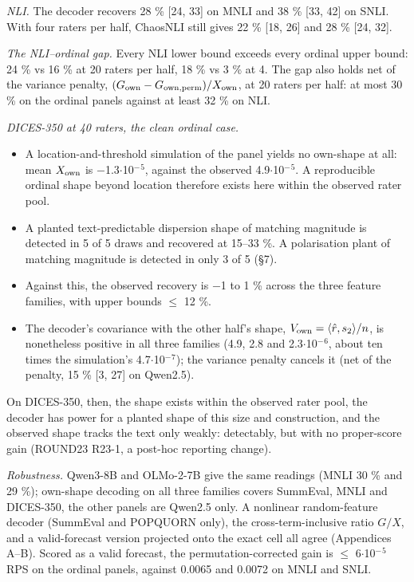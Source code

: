 \documentclass[10pt,twocolumn]{article}
\providecommand{\tightlist}{\setlength{\itemsep}{0pt}\setlength{\parskip}{0pt}}
\begin{document}
\emph{NLI.} The decoder recovers 28 \% {[}24, 33{]} on MNLI and 38 \% {[}33, 42{]} on SNLI. With four raters per half, ChaosNLI still gives 22 \% {[}18, 26{]} and 28 \% {[}24, 32{]}.

\emph{The NLI--ordinal gap.} Every NLI lower bound exceeds every ordinal upper bound: 24 \% vs 16 \% at 20 raters per half, 18 \% vs 3 \% at 4. The gap also holds net of the variance penalty, \((G_{\rm own}-G_{\rm own,perm})/X_{\rm own}\), at 20 raters per half: at most 30 \% on the ordinal panels against at least 32 \% on NLI.

\emph{DICES-350 at 40 raters, the clean ordinal case.}

\begin{itemize}
\tightlist
\item
  A location-and-threshold simulation of the panel yields no own-shape at all: mean \(X_{\rm own}\) is $-$1.3$\cdot$10$^{-}$$^{5}$, against the observed 4.9$\cdot$10$^{-}$$^{5}$. A reproducible ordinal shape beyond location therefore exists here within the observed rater pool.
\item
  A planted text-predictable dispersion shape of matching magnitude is detected in 5 of 5 draws and recovered at 15--33 \%. A polarisation plant of matching magnitude is detected in only 3 of 5 (\S{}7).
\item
  Against this, the observed recovery is $-$1 to 1 \% across the three feature families, with upper bounds $\leq$ 12 \%.
\item
  The decoder's covariance with the other half's shape, \(V_{\rm own}=\langle\hat r,s_2\rangle/n\), is nonetheless positive in all three families (4.9, 2.8 and 2.3$\cdot$10$^{-}$$^{6}$, about ten times the simulation's 4.7$\cdot$10$^{-}$$^{7}$); the variance penalty cancels it (net of the penalty, 15 \% {[}3, 27{]} on Qwen2.5).
\end{itemize}

On DICES-350, then, the shape exists within the observed rater pool, the decoder has power for a planted shape of this size and construction, and the observed shape tracks the text only weakly: detectably, but with no proper-score gain (ROUND23 R23-1, a post-hoc reporting change).

\emph{Robustness.} Qwen3-8B and OLMo-2-7B give the same readings (MNLI 30 \% and 29 \%); own-shape decoding on all three families covers SummEval, MNLI and DICES-350, the other panels are Qwen2.5 only. A nonlinear random-feature decoder (SummEval and POPQUORN only), the cross-term-inclusive ratio \(G/X\), and a valid-forecast version projected onto the exact cell all agree (Appendices A--B). Scored as a valid forecast, the permutation-corrected gain is $\leq$ 6$\cdot$10$^{-}$$^{5}$ RPS on the ordinal panels, against 0.0065 and 0.0072 on MNLI and SNLI.
\end{document}
